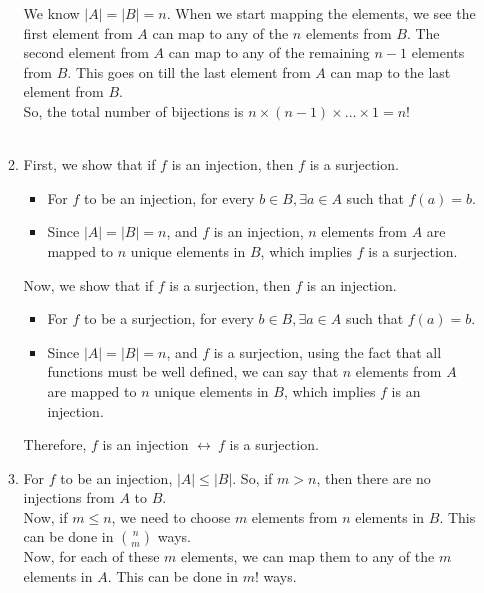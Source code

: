 \documentclass[a4paper]{article}
\begin{document}
\begin{enumerate}
\begin{enumerate}
        We know $|A| = |B| = n$. When we start mapping the elements, we see the first element from $A$ can map to any of the $n$ elements from $B$. The second element from $A$ can map to any of the remaining $n-1$ elements from $B$. This goes on till the last element from $A$ can map to the last element from $B$.\\

        So, the total number of bijections is $n \times (n-1) \times \dots \times 1 = n!$\\ \\

        \item First, we show that if $f$ is an injection, then $f$ is a surjection.\\
        \begin{itemize}
            \item For $f$ to be an injection, for every $b \in B, \exists a \in A$ such that $f(a) = b$.\\
            \item Since $|A| = |B| = n$, and $f$ is an injection, $n$ elements from $A$ are mapped to $n$ unique elements in $B$, which implies $f$ is a surjection.\\
        \end{itemize}

        Now, we show that if $f$ is a surjection, then $f$ is an injection.\\
        \begin{itemize}
            \item For $f$ to be a surjection, for every $b \in B, \exists a \in A$ such that $f(a) = b$.\\
            \item Since $|A| = |B| = n$, and $f$ is a surjection, using the fact that all functions must be well defined, we can say that $n$ elements from $A$ are mapped to $n$ unique elements in $B$, which implies $f$ is an injection.\\
        \end{itemize}

        Therefore, $f$ is an injection $\leftrightarrow \ f$ is a surjection.\\

        \item For $f$ to be an injection, $|A| \leq |B|$. So, if $m > n$, then there are no injections from $A$ to $B$.\\
        
        Now, if $m \leq n$, we need to choose $m$ elements from $n$ elements in $B$. This can be done in $\binom{n}{m}$ ways.\\
        Now, for each of these $m$ elements, we can map them to any of the $m$ elements in $A$. This can be done in $m!$ ways.\\


\end{enumerate}
\end{enumerate}
\end{document}
